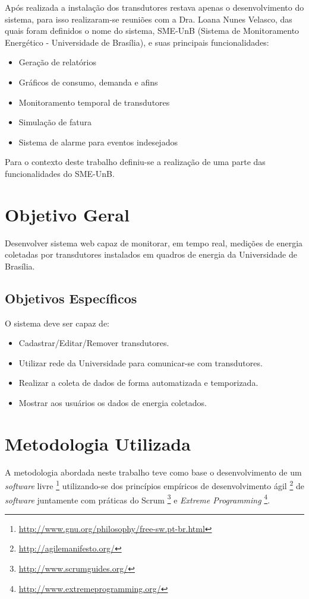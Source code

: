 Após realizada a instalação dos transdutores restava apenas o desenvolvimento do sistema, para isso realizaram-se reuniões com a Dra. Loana Nunes Velasco, das quais foram definidos o nome do sistema, SME-UnB (Sistema de Monitoramento Energético - Universidade de Brasília), e suas principais funcionalidades:
\begin{itemize}
    \item Geração de relatórios
    \item Gráficos de consumo, demanda e afins
    \item Monitoramento temporal de transdutores
    \item Simulação de fatura
    \item Sistema de alarme para eventos indesejados
\end{itemize}

Para o contexto deste trabalho definiu-se a realização de uma parte das funcionalidades do SME-UnB.

\section{Objetivo Geral}
Desenvolver sistema web capaz de monitorar, em tempo real, medições de energia coletadas por transdutores
instalados em quadros de energia da Universidade de Brasília.

\subsection{Objetivos Específicos}
O sistema deve ser capaz de:
\begin{itemize}
    \item Cadastrar/Editar/Remover transdutores.
    \item Utilizar rede da Universidade para comunicar-se com transdutores.
    \item Realizar a coleta de dados de forma automatizada e temporizada.
    \item Mostrar aos usuários os dados de energia coletados.
\end{itemize}

\section{Metodologia Utilizada}
A metodologia abordada neste trabalho teve como base o desenvolvimento de um \textit{software} livre \footnote{\url{http://www.gnu.org/philosophy/free-sw.pt-br.html}} utilizando-se dos princípios empíricos de desenvolvimento ágil \footnote{\url{http://agilemanifesto.org/}} de \textit{software} juntamente com práticas do Scrum \footnote{\url{http://www.scrumguides.org/}} e \textit{Extreme Programming} \footnote{\url{http://www.extremeprogramming.org/}}.

